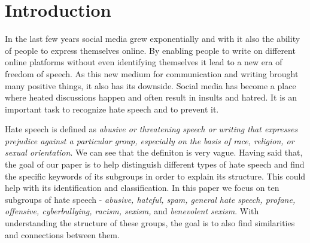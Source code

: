 \documentclass[fleqn,moreauthors,10pt]{ds_report}
\affiliation{\textit{Advisors: Slavko Žitnik}}
\begin{document}
\flushbottom 

\maketitle 

\thispagestyle{empty} 


\section*{Introduction}
In the last few years social media grew exponentially and with it also the ability of people to express themselves online. By enabling people to write on different online platforms without even identifying themselves it lead to a new era of freedom of speech. As this new medium for communication and writing brought many positive things, it also has its downside. Social media has become a place where heated discussions happen and often result in insults and hatred. It is an important task to recognize hate speech and to prevent it.

Hate speech is defined as \textit{abusive or threatening speech or writing that expresses prejudice against a particular group, especially on the basis of race, religion, or sexual orientation}\cite{hate_speech}. We can see that the definiton is very vague. Having said that, the goal of our paper is to help distinguish different types of hate speech and find the specific keywords of its subgroups in order to explain its structure. This could help with its identification and classification. In this paper we focus on ten subgroups of hate speech - \textit{abusive, hateful, spam, general hate speech, profane, offensive, cyberbullying, racism, sexism, } and \textit{benevolent sexism}. With understanding the structure of these groups, the goal is to also find similarities and connections between them.
\end{document}
